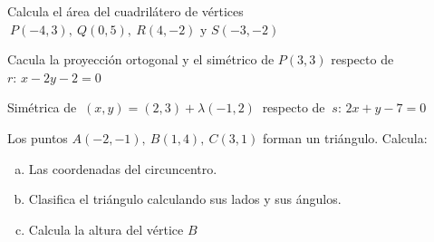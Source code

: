 \begin{mipropuesto}

Calcula el área del cuadrilátero de vértices $\ P(-4,3),\ Q(0,5),\ R(4,-2) \text{ y } S(-3,-2)$

\end{mipropuesto}

\vspace{-8mm}
\begin{flushright}
\begin{footnotesize} \textcolor{gris}{}	\end{footnotesize}
\end{flushright}


\begin{mipropuesto}

Cacula la proyección ortogonal y el simétrico de $P(3,3)$ respecto de $r:\, x-2y-2=0$

\end{mipropuesto}

\vspace{-8mm}
\begin{flushright}
\begin{footnotesize} \textcolor{gris}{}	\end{footnotesize}
\end{flushright}


\begin{mipropuesto}

Simétrica de $\ (x,y)=(2,3)+\lambda(-1,2)\ $ respecto de $\ s:\, 2x+y-7=0$

\end{mipropuesto}

\vspace{-8mm}
\begin{flushright}
\begin{footnotesize} \textcolor{gris}{}	\end{footnotesize}
\end{flushright}

\begin{mipropuesto}

Los puntos $A(-2,-1),\ B(1,4),\ C(3,1)$ forman un triángulo. Calcula:

\begin{enumerate}[a) ]
\item Las coordenadas del circuncentro.
\item Clasifica el triángulo calculando sus lados y sus ángulos.
\item Calcula la altura del vértice $B$	
\end{enumerate}


\end{mipropuesto}

